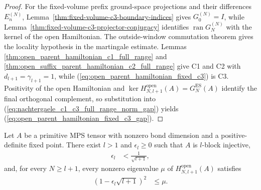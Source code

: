 \begin{proof}
    \leanok
    For the fixed-volume prefix ground-space projections and their differences
    $E_n^{(N)}$, Lemma~\ref{thm:fixed-volume-c3-boundary-indices} gives
    $G_0^{(N)}=I$, while
    Lemma~\ref{thm:fixed-volume-c3-projector-conjugacy} identifies
    $\operatorname{ran}G_N^{(N)}$ with the kernel of the open Hamiltonian.
    The outside-window commutation theorem gives the locality hypothesis in
    the martingale estimate. Lemmas
    \ref{thm:open_parent_hamiltonian_c1_full_range} and
    \ref{thm:open_suffix_parent_hamiltonian_c2_full_range} give C1 and C2 with
    $d_{l+1}=\gamma_{l+1}=1$, while
    (\ref{eq:open_parent_hamiltonian_fixed_c3}) is C3.  Positivity of the open
    Hamiltonian and
    $\ker H^{\mathrm{open}}_{N,l+1}(A)=G_N^{\mathrm{ES}}(A)$ identify the
    final orthogonal complement, so substitution into
    (\ref{eq:nachtergaele_c1_c3_full_range_norm_gap}) yields
    (\ref{eq:open_parent_hamiltonian_fixed_c3_gap}).
\end{proof}

\begin{lemma}
    \label{thm:primitive_open_parent_hamiltonian_gap}
    \leanok
    Let $A$ be a primitive MPS tensor with nonzero bond dimension and a
    positive-definite fixed point.  There exist $l>1$ and $\epsilon_l\geq0$
    such that $A$ is $l$-block injective,
    \begin{align}
        \epsilon_l & <\frac{1}{\sqrt{l+1}},
        \label{eq:primitive_open_parent_hamiltonian_threshold}
    \end{align}
    and, for every $N\geq l+1$, every nonzero eigenvalue $\mu$ of
    $H^{\mathrm{open}}_{N,l+1}(A)$ satisfies
    \begin{align}
        \left(1-\epsilon_l\sqrt{l+1}\right)^2
         & \leq\mu.
        \label{eq:primitive_open_parent_hamiltonian_gap}
    \end{align}
\end{lemma}

